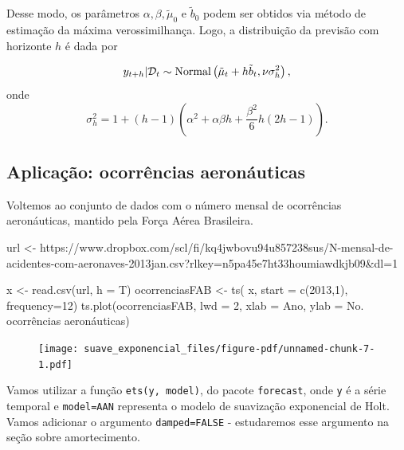 \documentclass[
  letterpaper,
  DIV=11,
  numbers=noendperiod]{scrreprt}
\newenvironment{Shaded}{\begin{snugshade}}{\end{snugshade}}
\newcommand{\AttributeTok}[1]{\textcolor[rgb]{0.40,0.45,0.13}{#1}}
\newcommand{\DecValTok}[1]{\textcolor[rgb]{0.68,0.00,0.00}{#1}}
\newcommand{\FunctionTok}[1]{\textcolor[rgb]{0.28,0.35,0.67}{#1}}
\newcommand{\NormalTok}[1]{\textcolor[rgb]{0.00,0.23,0.31}{#1}}
\newcommand{\OtherTok}[1]{\textcolor[rgb]{0.00,0.23,0.31}{#1}}
\newcommand{\StringTok}[1]{\textcolor[rgb]{0.13,0.47,0.30}{#1}}
\theoremstyle{definition}
\theoremstyle{plain}
\theoremstyle{definition}
\theoremstyle{plain}
\theoremstyle{remark}
\begin{document}
Desse modo, os parâmetros \(\alpha,\beta,\tilde{\mu}_0\) e
\(\tilde{b}_0\) podem ser obtidos via método de estimação da máxima
verossimilhança. Logo, a distribuição da previsão com horizonte \(h\) é
dada por

\[y_{t+h}|\mathcal{D}_t\sim\hbox{Normal}\left(\tilde{\mu}_t+h\tilde{b}_t, \nu\sigma^2_h\right),\]
onde
\[\sigma^2_h = 1+(h-1)\left(\alpha^2 + \alpha\beta h + \frac{\beta^2}{6}h(2h-1)\right).\]

\hypertarget{aplicauxe7uxe3o-ocorruxeancias-aeronuxe1uticas}{%
\subsection{Aplicação: ocorrências
aeronáuticas}\label{aplicauxe7uxe3o-ocorruxeancias-aeronuxe1uticas}}

Voltemos ao conjunto de dados com o número mensal de ocorrências
aeronáuticas, mantido pela Força Aérea Brasileira.

\begin{Shaded}
\begin{Highlighting}[]
\NormalTok{url }\OtherTok{\textless{}{-}} \StringTok{\textquotesingle{}https://www.dropbox.com/scl/fi/kq4jwbovu94u857238sus/N{-}mensal{-}de{-}acidentes{-}com{-}aeronaves{-}2013jan.csv?rlkey=n5pa45e7ht33houmiawdkjb09\&dl=1\textquotesingle{}}


\NormalTok{x }\OtherTok{\textless{}{-}} \FunctionTok{read.csv}\NormalTok{(url, }\AttributeTok{h =}\NormalTok{ T)}
\NormalTok{ocorrenciasFAB }\OtherTok{\textless{}{-}} \FunctionTok{ts}\NormalTok{( x, }\AttributeTok{start =} \FunctionTok{c}\NormalTok{(}\DecValTok{2013}\NormalTok{,}\DecValTok{1}\NormalTok{), }\AttributeTok{frequency=}\DecValTok{12}\NormalTok{)}
\FunctionTok{ts.plot}\NormalTok{(ocorrenciasFAB, }\AttributeTok{lwd =} \DecValTok{2}\NormalTok{, }\AttributeTok{xlab =} \StringTok{\textquotesingle{}Ano\textquotesingle{}}\NormalTok{, }\AttributeTok{ylab =} \StringTok{\textquotesingle{}No. ocorrências aeronáuticas\textquotesingle{}}\NormalTok{)}
\end{Highlighting}
\end{Shaded}

\begin{figure}[H]

{\centering \texttt{[image: suave\_exponencial\_files/figure-pdf/unnamed-chunk-7-1.pdf]}

}

\end{figure}

Vamos utilizar a função \texttt{ets(y,\ model)}, do pacote
\texttt{forecast}, onde \texttt{y} é a série temporal e
\texttt{model=\textquotesingle{}AAN\textquotesingle{}} representa o
modelo de suavização exponencial de Holt. Vamos adicionar o argumento
\texttt{damped=FALSE} - estudaremos esse argumento na seção sobre
amortecimento.
\end{document}
